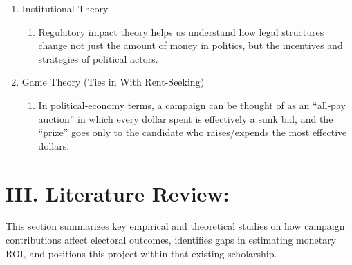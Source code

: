 \documentclass[12pt]{article}
\begin{document}
\begin{enumerate}[label=\Alph*.]
    
    \item Institutional Theory

    \begin{enumerate}[label=\arabic*)]
        \item Regulatory impact theory helps us understand how legal structures change not just the amount of money in politics, but the incentives and strategies of political actors.
    \end{enumerate}

    \item Game Theory (Ties in With Rent-Seeking)
    
    \begin{enumerate}[label=\arabic*)]
      \item In political‐economy terms, a campaign can be thought of as an “all‐pay auction” in which every dollar spent is effectively a sunk bid, and the “prize” goes only to the candidate who raises/expends the most effective dollars. 
  \end{enumerate}
\end{enumerate}

  

\section*{III. Literature Review:} This section summarizes key empirical and theoretical studies on how campaign contributions affect electoral outcomes, identifies gaps in estimating monetary ROI, and positions this project within that existing scholarship.
\end{document}
